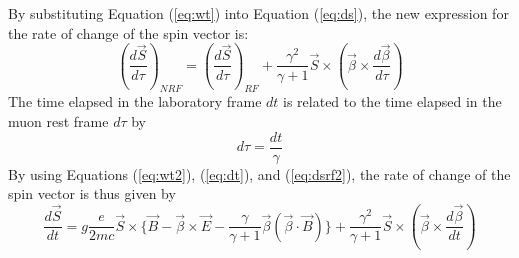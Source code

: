 \documentclass{outhesis}
\begin{document}
By substituting Equation (\ref{eq:wt}) into Equation (\ref{eq:ds}), the new expression for the rate of change of the spin vector is:
\begin{equation}
\label{eq:wt2}
\left(\frac{d \overrightarrow{S}}{d\tau}\right)_{NRF} = \left(\frac{d \overrightarrow{S}}{d\tau}\right)_{RF} + \frac{\gamma^2}{\gamma + 1} \overrightarrow{S} \times 
\left( \overrightarrow{\beta} \times \frac{d \overrightarrow{\beta}}{d\tau} \right)
\end{equation}
The time elapsed in the laboratory frame $dt$ is related to the time elapsed in the muon rest frame $d \tau$ by 
\begin{equation}
\label{eq:dt}
d \tau = \frac{dt}{\gamma}
\end{equation}
By using Equations (\ref{eq:wt2}), (\ref{eq:dt}), and (\ref{eq:dsrf2}), the rate of change of the spin vector is thus given by 
\begin{equation}
\label{eq:wt3}
\frac{d \overrightarrow{S}}{dt} = g\frac{e}{2mc}\overrightarrow{S} \times \{\overrightarrow{B}-\overrightarrow{\beta}\times\overrightarrow{E}
- \frac{\gamma}{\gamma+1}\overrightarrow{\beta}\left(\overrightarrow{\beta} \cdot \overrightarrow{B}\right)\}
+ \frac{\gamma^2}{\gamma + 1} \overrightarrow{S} \times
\left( \overrightarrow{\beta} \times \frac{d \overrightarrow{\beta}}{dt} \right)
\end{equation}
\end{document}
